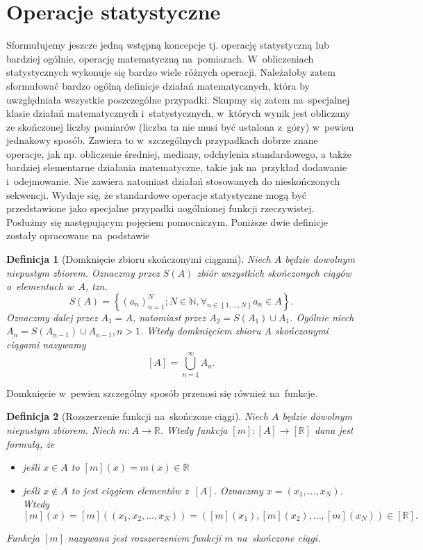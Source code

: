 \documentclass[12pt,a4paper]{report}
\newtheorem{definition}{Definicja}[chapter]
\newcommand{\zbior}[1]{\left\lbrace {#1} \right\rbrace }
\newcommand{\domkniecie}[1]{\left[ {#1} \right] }
\begin{document}
\section{Operacje statystyczne}
 Sformułujemy jeszcze jedną wstępną koncepcje tj. operację statystyczną lub bardziej ogólnie, operację matematyczną na~pomiarach. W~obliczeniach statystycznych wykonuje się bardzo wiele różnych operacji. Należałoby zatem sformułować bardzo ogólną definicje działań matematycznych, która by uwzględniała wszystkie poszczególne przypadki. Skupmy się zatem na~specjalnej klasie działań matematycznych i~statystycznych, w~których wynik jest obliczany ze skończonej liczby pomiarów (liczba ta nie musi być ustalona z~góry) w~pewien jednakowy sposób. Zawiera to w~szczególnych przypadkach dobrze znane operacje, jak np. obliczenie średniej, mediany, odchylenia standardowego, a także bardziej elementarne działania matematyczne, takie jak na~przykład dodawanie i~odejmowanie. Nie zawiera natomiast działań stosowanych do nieskończonych sekwencji. Wydaje się, że standardowe operacje statystyczne mogą być przedstawione jako specjalne przypadki uogólnionej funkcji rzeczywistej. Posłużmy się następującym pojęciem pomocniczym. 
Poniższe dwie definicje zostały opracowane na~podstawie {\cite[Sec. 4]{adams1965theory}}
\begin{definition}[Domknięcie zbioru skończonymi ciągami]
Niech $A$ będzie dowolnym niepustym zbiorem. Oznaczmy przez $S(A)$ zbiór wszystkich skończonych ciągów o~elementach w~$A$, tzn.
$$
S(A)=\zbior{(a_n)^{N}_{n=1}; N\in \mathbb{N}, \forall_{n\in \zbior{1,\dots,N}} a_n \in A}.
$$
Oznaczmy dalej przez $A_1 =A$, natomiast przez $A_2 = S(A_1) \cup A_1$. Ogólnie niech $A_n = S(A_{n-1})\cup A_{n-1}, n>1$. Wtedy domknięciem zbioru $A$ skończonymi ciągami nazywamy
$$
\domkniecie{A}=\bigcup^{\infty}_{n=1} A_n.
$$ 
\end{definition}
Domknięcie w~pewien szczególny sposób przenosi się również na~funkcje.
\begin{definition}[Rozszerzenie funkcji na~skończone ciągi]
Niech $A$ będzie dowolnym niepustym zbiorem. Niech $m:A\to \mathbb{R}$. Wtedy funkcja $\domkniecie{m}:\domkniecie{A}\to \domkniecie{\mathbb{R}}$ dana jest formułą, że
\begin{itemize}
\item jeśli $x\in A$ to $\domkniecie{m}(x) =m(x) \in \mathbb{R}$
\item jeśli $x\notin A$ to jest ciągiem elementów z~$\domkniecie{A}$. Oznaczmy $x=(x_1,\dots,x_N)$. Wtedy 
$$
\domkniecie{m}(x)=\domkniecie{m}((x_1,x_2,\dots,x_N))=(\domkniecie{m}(x_1),\domkniecie{m}(x_2),\dots, \domkniecie{m}(x_N))\in \domkniecie{\mathbb{R}}.
$$
\end{itemize}
Funkcja $\domkniecie{m}$ nazywana jest rozszerzeniem funkcji $m$ na~skończone ciągi.
\end{definition}
\end{document}
